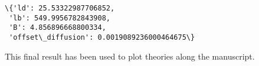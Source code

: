 \documentclass[11pt]{article}
\makeatletter
\newcommand{\boxspacing}{\kern\kvtcb@left@rule\kern\kvtcb@boxsep}
\newcommand{\prompt}[4]{
        {\ttfamily\llap{{\color{#2}[#3]:\hspace{3pt}#4}}\vspace{-\baselineskip}}
    }
\makeatother
\begin{document}
            \begin{tcolorbox}[breakable, size=fbox, boxrule=.5pt, pad at break*=1mm, opacityfill=0]
\prompt{Out}{outcolor}{57}{\boxspacing}
\begin{Verbatim}[commandchars=\\\{\}]
\{'ld': 25.53322987706852,
 'lb': 549.9956782843908,
 'B': 4.856896668800334,
 'offset\_diffusion': 0.0019089236000464675\}
\end{Verbatim}
\end{tcolorbox}
        
    This final result has been used to plot theories along the manuscript.


    
    
    
\end{document}

